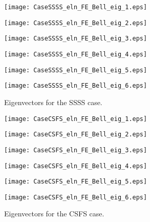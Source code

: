 \documentclass[preprint,12pt]{elsarticle}
\begin{document}
\begin{figure}[p]%
	\texttt{[image: CaseSSSS\_eln\_FE\_Bell\_eig\_1.eps]}
	\caption*{$\widehat{\omega}_{1}$}\label{fig:SSSS1}%
	\endminipage
	\texttt{[image: CaseSSSS\_eln\_FE\_Bell\_eig\_2.eps]}
	\caption*{$\widehat{\omega}_{2}$}\label{fig:SSSS2}%
	\endminipage
	\texttt{[image: CaseSSSS\_eln\_FE\_Bell\_eig\_3.eps]}
	\caption*{$\widehat{\omega}_{3}$}\label{fig:SSSS3}%
	\endminipage
	\texttt{[image: CaseSSSS\_eln\_FE\_Bell\_eig\_4.eps]}
	\caption*{$\widehat{\omega}_{4}$}\label{fig:SSSS4}%
	\endminipage
	\texttt{[image: CaseSSSS\_eln\_FE\_Bell\_eig\_5.eps]}
	\caption*{$\widehat{\omega}_{5}$}\label{fig:SSSS5}%
	\endminipage
	\texttt{[image: CaseSSSS\_eln\_FE\_Bell\_eig\_6.eps]}
	\caption*{$\widehat{\omega}_{6}$}\label{fig:SSSS6}%
	\endminipage
	\caption[Eigenvectors for SSSS]{Eigenvectors for the SSSS case.}%
	\label{fig:SSSS}%
\end{figure}
\begin{figure}[p]%
	\texttt{[image: CaseCSFS\_eln\_FE\_Bell\_eig\_1.eps]}
	\caption*{$\widehat{\omega}_{1}$}\label{fig:CSFS1}%
	\endminipage
	\texttt{[image: CaseCSFS\_eln\_FE\_Bell\_eig\_2.eps]}
	\caption*{$\widehat{\omega}_{2}$}\label{fig:CSFS2}%
	\endminipage
	\texttt{[image: CaseCSFS\_eln\_FE\_Bell\_eig\_3.eps]}
	\caption*{$\widehat{\omega}_{3}$}\label{fig:CSFS3}%
	\endminipage
	\texttt{[image: CaseCSFS\_eln\_FE\_Bell\_eig\_4.eps]}
	\caption*{$\widehat{\omega}_{4}$}\label{fig:CSFS4}%
	\endminipage
	\texttt{[image: CaseCSFS\_eln\_FE\_Bell\_eig\_5.eps]}
	\caption*{$\widehat{\omega}_{5}$}\label{fig:CSFS5}%
	\endminipage
	\texttt{[image: CaseCSFS\_eln\_FE\_Bell\_eig\_6.eps]}
	\caption*{$\widehat{\omega}_{6}$}\label{fig:CSFS6}%
	\endminipage
	\caption[Eigenvectors for CSFS]{Eigenvectors for the CSFS case.}%
	\label{fig:CSFS}%
\end{figure}
\end{document}
